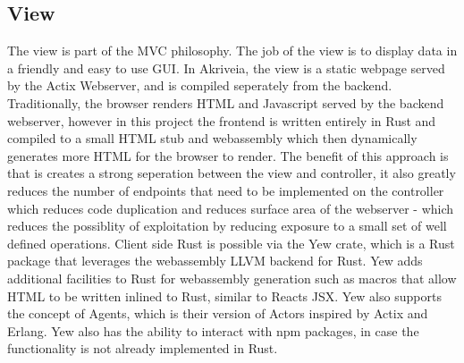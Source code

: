 \subsection{View}
\medskip
\label{view_section}
The view is part of the MVC philosophy.
The job of the view is to display data in a friendly and easy to use GUI.
In Akriveia, the view is a static webpage served by the Actix Webserver, and is compiled seperately from the backend.
Traditionally, the browser renders HTML and Javascript served by the backend webserver, however in this project the frontend is written entirely in Rust and compiled to a small HTML stub and webassembly which then dynamically generates more HTML for the browser to render.
The benefit of this approach is that is creates a strong seperation between the view and controller, it also greatly reduces the number of endpoints that need to be implemented on the controller which reduces code duplication and reduces surface area of the webserver - which reduces the possiblity of exploitation by reducing exposure to a small set of well defined operations.
Client side Rust is possible via the Yew crate, which is a Rust package that leverages the webassembly LLVM backend for Rust.
Yew adds additional facilities to Rust for webassembly generation such as macros that allow HTML to be written inlined to Rust, similar to Reacts JSX.
Yew also supports the concept of Agents, which is their version of Actors inspired by Actix and Erlang.
Yew also has the ability to interact with npm packages, in case the functionality is not already implemented in Rust.

